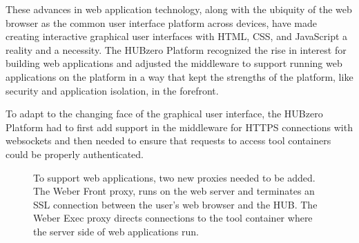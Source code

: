 \documentclass[conference]{../sty/IEEEtran}
\begin{document}
These advances in web application technology, along with the ubiquity of the
web browser as the common user interface platform across devices, have made
creating interactive graphical user interfaces with HTML, CSS, and JavaScript a
reality and a necessity. The HUBzero Platform recognized the rise in interest
for building web applications and adjusted the middleware to support running
web applications on the platform in a way that kept the strengths of the
platform, like security and application isolation, in the forefront.

To adapt to the changing face of the graphical user interface, the HUBzero
Platform had to first add support in the middleware for HTTPS connections with
websockets and then needed to ensure that requests to access tool containers
could be properly authenticated.

\begin{figure}[H]
  \centering
  \caption{To support web applications, two new proxies needed to be added.
The Weber Front proxy, runs on the web server and terminates an SSL connection
between the user's web browser and the HUB. The Weber Exec proxy directs
connections to the tool container where the server side of web applications
 run.}
  \label{fig_sim}
\end{figure}
\end{document}

